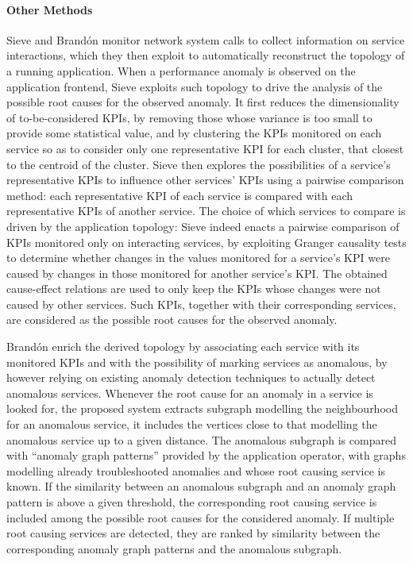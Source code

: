 \paragraph{Other Methods}
Sieve \cite{30_Thalheim2017_Sieve} and Brand\'on \etal \cite{11_Brandon2020_GraphBasedRootCauseAnalysis} monitor network system calls to collect information on service interactions, which they then exploit to automatically reconstruct the topology of a running application.
When a performance anomaly is observed on the application frontend, Sieve \cite{30_Thalheim2017_Sieve} exploits such topology to drive the analysis of the possible root causes for the observed anomaly.
It first reduces the dimensionality of to-be-considered KPIs, by removing those whose variance is too small to provide some statistical value, and by clustering the KPIs monitored on each service so as to consider only one representative KPI for each cluster, \viz that closest to the centroid of the cluster.
Sieve \cite{30_Thalheim2017_Sieve} then explores the possibilities of a service’s representative KPIs to influence other services’ KPIs using a pairwise comparison method: each representative KPI of each service is compared with each representative KPIs of another service. 
The choice of which services to compare is driven by the application topology: 
Sieve \cite{30_Thalheim2017_Sieve} indeed enacts a pairwise comparison of KPIs monitored only on interacting services, by exploiting Granger causality tests \cite{Arnold2007_GrangerMethodsTemporalCausalModelling} to determine whether changes in the values monitored for a service's KPI were caused by changes in those monitored for another service's KPI.
The obtained cause-effect relations are used to only keep the KPIs whose changes were not caused by other services.
Such KPIs, together with their corresponding services, are considered as the possible root causes for the observed anomaly.

Brand\'on \etal \cite{11_Brandon2020_GraphBasedRootCauseAnalysis} enrich the derived topology by associating each service with its monitored KPIs and with the possibility of marking services as anomalous, by however relying on existing anomaly detection techniques to actually detect anomalous services.
Whenever the root cause for an anomaly in a service is looked for, the proposed system extracts subgraph modelling the neighbourhood for an anomalous service, \viz it includes the vertices close to that modelling the anomalous service up to a given distance.
The anomalous subgraph is compared with \enquote{anomaly graph patterns} provided by the application operator, \viz with graphs modelling already troubleshooted anomalies and whose root causing service is known.
If the similarity between an anomalous subgraph and an anomaly graph pattern is above a given threshold, the corresponding root causing service is included among the possible root causes for the considered anomaly.
If multiple root causing services are detected, they are ranked by similarity between the corresponding anomaly graph patterns and the anomalous subgraph.

